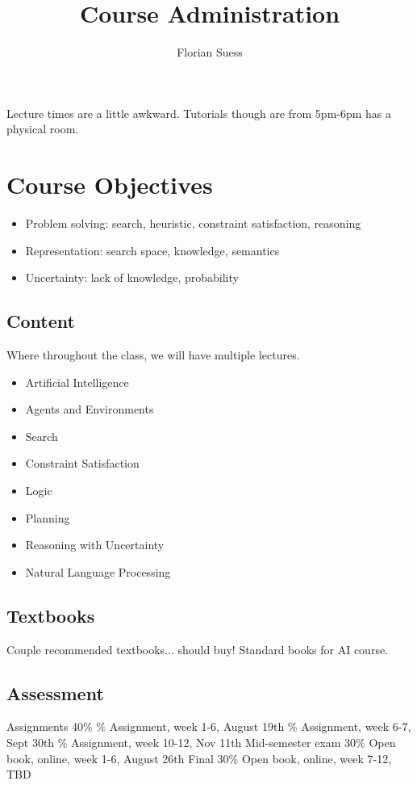 \documentclass{article}
\begin{document}
\title{Course Administration}
\date{}
\author{Florian Suess}
\maketitle

Lecture times are a little awkward. Tutorials though are from 5pm-6pm has a physical room.

\section{Course Objectives}
\begin{itemize}
				\item Problem solving: search, heuristic, constraint satisfaction, reasoning
				\item Representation: search space, knowledge, semantics 
				\item Uncertainty: lack of knowledge, probability
\end{itemize}

\subsection{Content}
Where throughout the class, we will have multiple lectures.
\begin{itemize}
				\item Artificial Intelligence
				\item Agents and Environments
				\item Search
				\item Constraint Satisfaction
				\item Logic
				\item Planning
				\item Reasoning with Uncertainty
				\item Natural Language Processing
\end{itemize}

\subsection*{Textbooks}
Couple recommended textbooks... should buy! Standard books for AI course.

\subsection*{Assessment}
\begin{outline}
				\1 Assignments 40\%
								\% Assignment, week 1-6, August 19th
								\% Assignment, week 6-7, Sept 30th
								\% Assignment, week 10-12, Nov 11th
				\1 Mid-semester exam 30\%
								\2 Open book, online, week 1-6, August 26th
				\1 Final 30\%
								\2 Open book, online, week 7-12, TBD
\end{outline}
\end{document}
